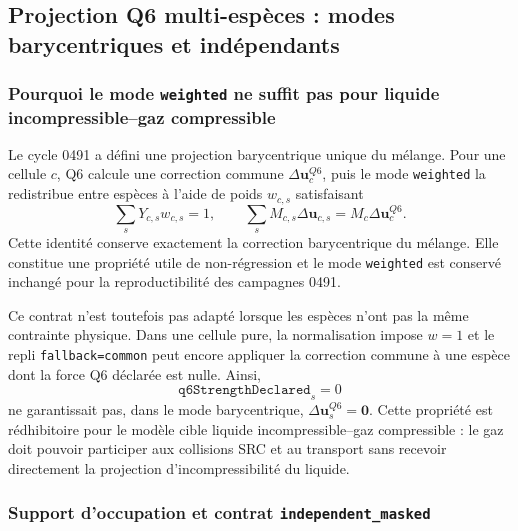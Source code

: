 \documentclass[11pt,a4paper]{article}
\begin{document}
\subsection{Projection Q6 multi-espèces : modes barycentriques et indépendants}

\subsubsection{Pourquoi le mode \texttt{weighted} ne suffit pas pour liquide incompressible--gaz compressible}

Le cycle 0491 a défini une projection barycentrique unique du mélange. Pour une cellule $c$, Q6 calcule une correction commune $\Delta\bm u^{Q6}_c$, puis le mode \texttt{weighted} la redistribue entre espèces à l'aide de poids $w_{c,s}$ satisfaisant
\begin{equation}
  \sum_s Y_{c,s}w_{c,s}=1,
  \qquad
  \sum_s M_{c,s}\Delta\bm u_{c,s}
  =M_c\Delta\bm u^{Q6}_c.
\end{equation}
Cette identité conserve exactement la correction barycentrique du mélange. Elle constitue une propriété utile de non-régression et le mode \texttt{weighted} est conservé inchangé pour la reproductibilité des campagnes 0491.

Ce contrat n'est toutefois pas adapté lorsque les espèces n'ont pas la même contrainte physique. Dans une cellule pure, la normalisation impose $w=1$ et le repli \texttt{fallback=common} peut encore appliquer la correction commune à une espèce dont la force Q6 déclarée est nulle. Ainsi,
\begin{equation}
  \texttt{q6StrengthDeclared}_s=0
\end{equation}
ne garantissait pas, dans le mode barycentrique, $\Delta\bm u^{Q6}_s=\bm 0$. Cette propriété est rédhibitoire pour le modèle cible liquide incompressible--gaz compressible : le gaz doit pouvoir participer aux collisions SRC et au transport sans recevoir directement la projection d'incompressibilité du liquide.

\subsubsection{Support d'occupation et contrat \texttt{independent\_masked}}
\end{document}
